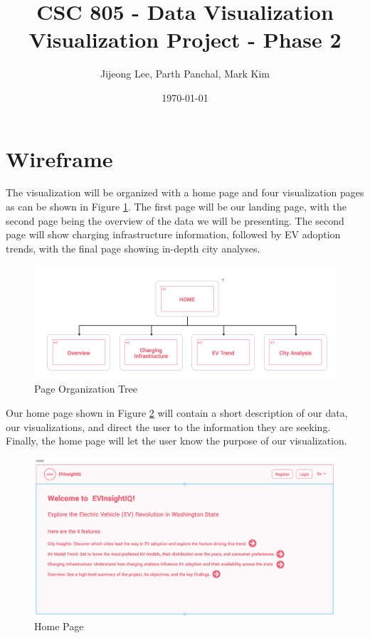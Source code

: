 \documentclass{article}
\title{CSC 805 - Data Visualization\\\large Visualization Project - Phase 2}
\author{Jijeong Lee, Parth Panchal, Mark Kim}
\date{\today}
\begin{document}
\maketitle


\section*{Wireframe}

The visualization will be organized with a home page and four visualization
pages as can be shown in Figure \ref{fig:tree}.  The first page will be our
landing page, with the second page being the overview of the data we will be
presenting.  The second page will show charging infrastructure information,
followed by EV adoption trends, with the final page showing in-depth city
analyses.
\begin{figure}[h]
    \centering
    \includegraphics[scale=0.4]{Tree.png}
    \caption{Page Organization Tree}
    \label{fig:tree}
\end{figure}

Our home page shown in Figure \ref{fig:home} will contain a short
description of our data, our visualizations, and direct the user to the
information they are seeking.  Finally, the home page will let the user know the
purpose of our visualization.
\begin{figure}[h]
    \centering
    \includegraphics[scale=0.25]{Home}
    \caption{Home Page}
    \label{fig:home}
\end{figure}
\end{document}
